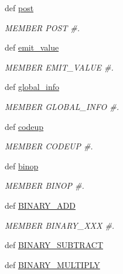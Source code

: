 \begin{DoxyCompactItemize}
def \hyperlink{classscipy_1_1weave_1_1bytecodecompiler_1_1CXXCoder_ae1e63d79a81bfa169d8ac46256d04b4f}{post}
\begin{DoxyCompactList}\small\item\em M\+E\+M\+B\+E\+R P\+O\+S\+T \#. \end{DoxyCompactList}\item 
def \hyperlink{classscipy_1_1weave_1_1bytecodecompiler_1_1CXXCoder_a3751204f5a439aa37f925128a7c45d7b}{emit\+\_\+value}
\begin{DoxyCompactList}\small\item\em M\+E\+M\+B\+E\+R E\+M\+I\+T\+\_\+\+V\+A\+L\+U\+E \#. \end{DoxyCompactList}\item 
def \hyperlink{classscipy_1_1weave_1_1bytecodecompiler_1_1CXXCoder_a8fc909b027708d151d3e049bf1037394}{global\+\_\+info}
\begin{DoxyCompactList}\small\item\em M\+E\+M\+B\+E\+R G\+L\+O\+B\+A\+L\+\_\+\+I\+N\+F\+O \#. \end{DoxyCompactList}\item 
def \hyperlink{classscipy_1_1weave_1_1bytecodecompiler_1_1CXXCoder_a6b6ee4afb8d8f37b341dff1b33eba321}{codeup}
\begin{DoxyCompactList}\small\item\em M\+E\+M\+B\+E\+R C\+O\+D\+E\+U\+P \#. \end{DoxyCompactList}\item 
def \hyperlink{classscipy_1_1weave_1_1bytecodecompiler_1_1CXXCoder_a52c4f35baab7cbfa6083d53bc6f83bac}{binop}
\begin{DoxyCompactList}\small\item\em M\+E\+M\+B\+E\+R B\+I\+N\+O\+P \#. \end{DoxyCompactList}\item 
def \hyperlink{classscipy_1_1weave_1_1bytecodecompiler_1_1CXXCoder_aa0cb94bbcf83c26b9fcff5a578271f76}{B\+I\+N\+A\+R\+Y\+\_\+\+A\+D\+D}
\begin{DoxyCompactList}\small\item\em M\+E\+M\+B\+E\+R B\+I\+N\+A\+R\+Y\+\_\+\+X\+X\+X \#. \end{DoxyCompactList}\item 
def \hyperlink{classscipy_1_1weave_1_1bytecodecompiler_1_1CXXCoder_a4233d20f51733b9387c460f48f99c2bc}{B\+I\+N\+A\+R\+Y\+\_\+\+S\+U\+B\+T\+R\+A\+C\+T}
\item 
def \hyperlink{classscipy_1_1weave_1_1bytecodecompiler_1_1CXXCoder_a1877110637db410b05a41fc12028c45d}{B\+I\+N\+A\+R\+Y\+\_\+\+M\+U\+L\+T\+I\+P\+L\+Y}

\end{DoxyCompactItemize}
